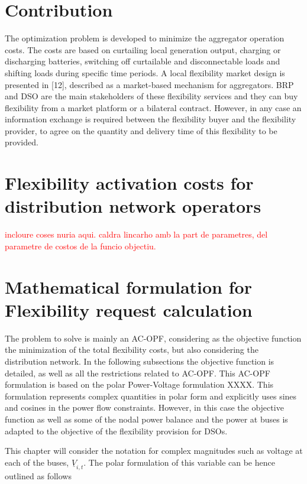 \section{Contribution}



The optimization problem is developed to minimize the aggregator operation costs. The costs are based on curtailing local generation output, charging or discharging batteries, switching off curtailable and disconnectable loads and shifting loads during specific time periods. A local flexibility market design is presented in [12], described as a market-based mechanism for aggregators. BRP and DSO are the main stakeholders of these flexibility services and they can buy flexibility from a market platform or a bilateral contract. However, in any case an information exchange is required between the flexibility buyer and the flexibility provider, to agree on the quantity and delivery time of this flexibility to be provided. 

\section{Flexibility activation costs for distribution network operators}
\textcolor{red}{incloure coses nuria aqui. caldra lincarho amb la part de parametres, del parametre de costos de la funcio objectiu.} 

\section{Mathematical formulation for Flexibility request calculation}
The problem to solve is mainly an AC-OPF, considering as the objective function the minimization of the total flexibility costs, but also considering the distribution network. In the following subsections the objective function is detailed, as well as all the restrictions related to AC-OPF. 
This AC-OPF formulation is based  on the polar Power-Voltage formulation XXXX. This formulation represents complex quantities in polar form and explicitly uses sines and cosines in the power flow constraints. However, in this case the objective function as well as some of the nodal power balance and the power at buses is adapted to the objective of the flexibility provision for DSOs.

This chapter will consider the notation for complex magnitudes such as voltage at each of the buses, $\underline{V}_{i,t}$. The polar formulation of this variable can be hence outlined as follows

